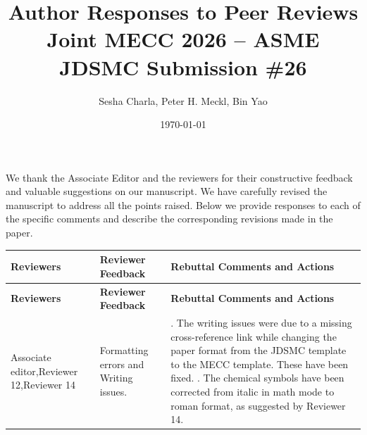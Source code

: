 \documentclass[letterpaper, 11pt]{article}
\title{Author Responses to Peer Reviews \\ \large Joint MECC 2026 -- ASME JDSMC Submission \#26}
\author{Sesha Charla, Peter H. Meckl, Bin Yao}
\date{\today}
\begin{document}
\maketitle

We thank the Associate Editor and the reviewers for their constructive feedback and valuable suggestions on our
manuscript. We have carefully revised the manuscript to address all the points raised. Below we provide responses to
each of the specific comments and describe the corresponding revisions made in the paper.

\renewcommand{\arraystretch}{1.3}
\begin{longtable}{>{\raggedright\arraybackslash}p{}>{\raggedright\arraybackslash}p{}>{\raggedright\arraybackslash}p{}}
    \toprule
    \textbf{Reviewers}                                                                                                                       &
    \textbf{Reviewer Feedback}                                                                                                               &
    \textbf{Rebuttal Comments and Actions}                                                                                                     \\ \midrule
    \endfirsthead
    \toprule
    \textbf{Reviewers}                                                                                                                       &
    \textbf{Reviewer Feedback}                                                                                                               &
    \textbf{Rebuttal Comments and Actions}                                                                                                     \\ \midrule
    \endhead
    \bottomrule
    \endfoot
    Associate editor,\newline Reviewer 12,\newline Reviewer 14                                                                               &
    Formatting errors and Writing issues.                                                                                                    &
    1. The writing issues were due to a missing cross-reference link while changing the paper format from the JDSMC template to the MECC template. These have been fixed. \newline
    2. The chemical symbols have been corrected from italic in math mode to roman format, as suggested by Reviewer 14.                         \\ \midrule

\end{longtable}
\end{document}
